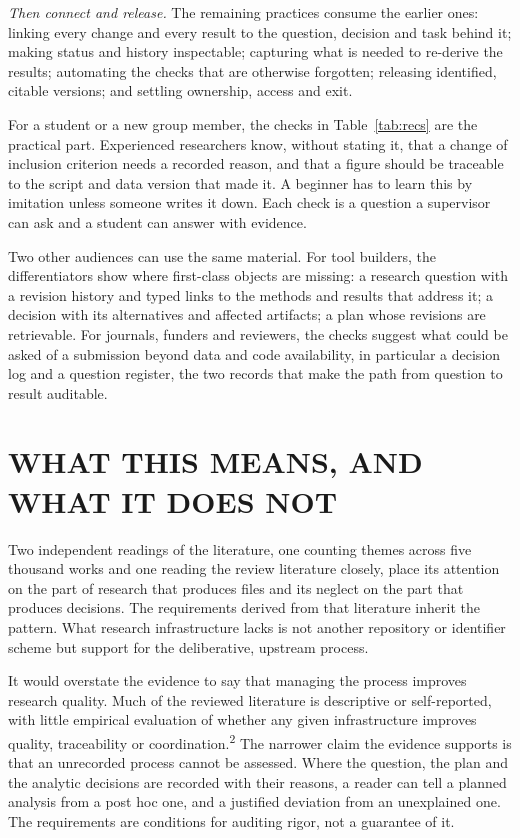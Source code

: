 \documentclass{IEEEcsmag}
\begin{document}
\emph{Then connect and release.} The remaining practices consume the earlier ones: linking every change and every result to the question, decision and task behind it; making status and history inspectable; capturing what is needed to re-derive the results; automating the checks that are otherwise forgotten; releasing identified, citable versions; and settling ownership, access and exit.

For a student or a new group member, the checks in Table~\ref{tab:recs} are the practical part. Experienced researchers know, without stating it, that a change of inclusion criterion needs a recorded reason, and that a figure should be traceable to the script and data version that made it. A beginner has to learn this by imitation unless someone writes it down. Each check is a question a supervisor can ask and a student can answer with evidence.

Two other audiences can use the same material. For tool builders, the differentiators show where first-class objects are missing: a research question with a revision history and typed links to the methods and results that address it; a decision with its alternatives and affected artifacts; a plan whose revisions are retrievable. For journals, funders and reviewers, the checks suggest what could be asked of a submission beyond data and code availability, in particular a decision log and a question register, the two records that make the path from question to result auditable.

\section{WHAT THIS MEANS, AND WHAT IT DOES NOT}

Two independent readings of the literature, one counting themes across five thousand works and one reading the review literature closely, place its attention on the part of research that produces files and its neglect on the part that produces decisions. The requirements derived from that literature inherit the pattern. What research infrastructure lacks is not another repository or identifier scheme but support for the deliberative, upstream process.

It would overstate the evidence to say that managing the process improves research quality. Much of the reviewed literature is descriptive or self-reported, with little empirical evaluation of whether any given infrastructure improves quality, traceability or coordination.\textsuperscript{2} The narrower claim the evidence supports is that an unrecorded process cannot be assessed. Where the question, the plan and the analytic decisions are recorded with their reasons, a reader can tell a planned analysis from a post hoc one, and a justified deviation from an unexplained one. The requirements are conditions for auditing rigor, not a guarantee of it.
\end{document}
